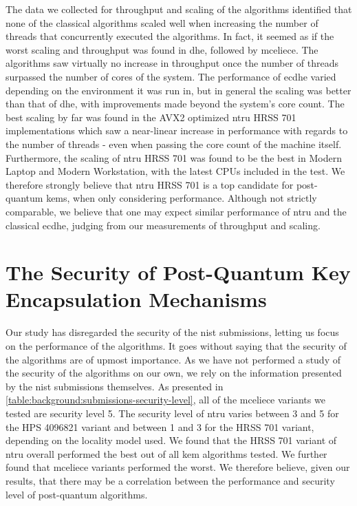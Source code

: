 The data we collected for throughput and scaling of the algorithms identified that none of the classical algorithms scaled well when increasing the number of threads that concurrently executed the algorithms. In fact, it seemed as if the worst scaling and throughput was found in \gls{dhe}, followed by \gls{mceliece}. The algorithms saw virtually no increase in throughput once the number of threads surpassed the number of cores of the system. The performance of \gls{ecdhe} varied depending on the environment it was run in, but in general the scaling was better than that of \gls{dhe}, with improvements made beyond the system's core count. The best scaling by far was found in the AVX2 optimized \gls{ntru} HRSS 701 implementations which saw a near-linear increase in performance with regards to the number of threads - even when passing the core count of the machine itself. Furthermore, the scaling of \gls{ntru} HRSS 701 was found to be the best in Modern Laptop and Modern Workstation, with the latest CPUs included in the test. We therefore strongly believe that \gls{ntru} HRSS 701 is a top candidate for \gls{post-quantum} \glspl{kem}, when only considering performance. Although not strictly comparable, we believe that one may expect similar performance of \gls{ntru} and the classical \gls{ecdhe}, judging from our measurements of throughput and scaling.


\section{The Security of Post-Quantum Key Encapsulation Mechanisms}

Our study has disregarded the security of the \gls{nist} submissions, letting us focus on the performance of the algorithms. It goes without saying that the security of the algorithms are of upmost importance. As we have not performed a study of the security of the algorithms on our own, we rely on the information presented by the \gls{nist} submissions themselves. As presented in \ref{table:background:submissions-security-level}, all of the \gls{mceliece} variants we tested are security level 5. The security level of \gls{ntru} varies between 3 and 5 for the HPS 4096821 variant and between 1 and 3 for the HRSS 701 variant, depending on the locality model used. We found that the HRSS 701 variant of \gls{ntru} overall performed the best out of all \gls{kem} algorithms tested. We further found that \gls{mceliece} variants performed the worst. We therefore believe, given our results, that there may be a correlation between the performance and security level of \gls{post-quantum} algorithms.


